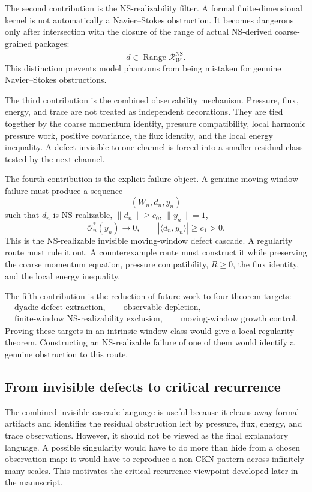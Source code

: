 \documentclass[11pt]{article}
\numberwithin{equation}{section}
\theoremstyle{plain}
\theoremstyle{definition}
\theoremstyle{remark}
\newcommand{\NS}{\mathrm{NS}}
\begin{document}
The second contribution is the NS-realizability filter.  A formal finite-dimensional kernel is not automatically a Navier--Stokes obstruction.  It becomes dangerous only after intersection with the closure of the range of actual NS-derived coarse-grained packages:
\[
        d\in
        \overline{\operatorname{Range}\mathcal R^{\NS}_W}.
\]
This distinction prevents model phantoms from being mistaken for genuine Navier--Stokes obstructions.

The third contribution is the combined observability mechanism.  Pressure, flux, energy, and trace are not treated as independent decorations.  They are tied together by the coarse momentum identity, pressure compatibility, local harmonic pressure work, positive covariance, the flux identity, and the local energy inequality.  A defect invisible to one channel is forced into a smaller residual class tested by the next channel.

The fourth contribution is the explicit failure object.  A genuine moving-window failure must produce a sequence
\[
        (W_n,d_n,y_n)
\]
such that \(d_n\) is NS-realizable, \(\|d_n\|\ge c_0\), \(\|y_n\|=1\),
\[
        \mathcal O_n^*(y_n)\to0,
        \qquad
        |\langle d_n,y_n\rangle|\ge c_1>0.
\]
This is the NS-realizable invisible moving-window defect cascade.  A regularity route must rule it out.  A counterexample route must construct it while preserving the coarse momentum equation, pressure compatibility, \(R\ge0\), the flux identity, and the local energy inequality.

The fifth contribution is the reduction of future work to four theorem targets:
\[
\begin{gathered}
\boxed{\text{dyadic defect extraction}},
\qquad
\boxed{\text{observable depletion}},\\[2mm]
\boxed{\text{finite-window NS-realizability exclusion}},
\qquad
\boxed{\text{moving-window growth control}}.
\end{gathered}
\]
Proving these targets in an intrinsic window class would give a local regularity theorem.  Constructing an NS-realizable failure of one of them would identify a genuine obstruction to this route.


\subsection*{From invisible defects to critical recurrence}

The combined-invisible cascade language is useful because it cleans away formal artifacts and identifies the residual obstruction left by pressure, flux, energy, and trace observations.  However, it should not be viewed as the final explanatory language.  A possible singularity would have to do more than hide from a chosen observation map: it would have to reproduce a non-CKN pattern across infinitely many scales.  This motivates the critical recurrence viewpoint developed later in the manuscript.
\end{document}
